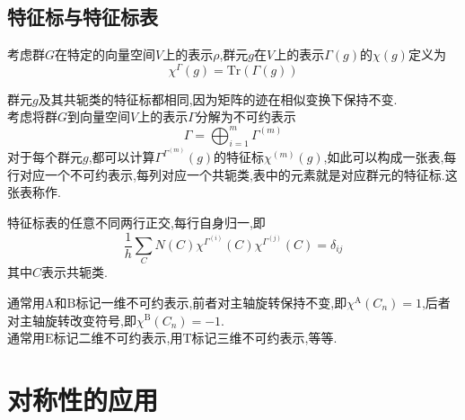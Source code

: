 \documentclass{ctexbook}
\begin{document}
\subsection{特征标与特征标表}
\begin{definition}[特征标]
    考虑群$G$在特定的向量空间$V$上的表示$\rho$,群元$g$在$V$上的表示$\Gamma(g)$的$\chi(g)$定义为
    \[\chi^{\Gamma}(g)=\text{Tr}(\Gamma(g))\]
\end{definition}
群元$g$及其共轭类的特征标都相同,因为矩阵的迹在相似变换下保持不变.\\
\indent 考虑将群$G$到向量空间$V$上的表示$\Gamma$分解为不可约表示
\[\Gamma=\bigoplus_{i=1}^{m}\Gamma^{(m)}\]
对于每个群元$g$,都可以计算$\Gamma^{\Gamma^{(m)}}(g)$的特征标$\chi^{(m)}(g)$,如此可以构成一张表,每行对应一个不可约表示,每列对应一个共轭类,表中的元素就是对应群元的特征标.这张表称作.
\begin{theorem}[正交归一定理]
    特征标表的任意不同两行正交,每行自身归一,即
    \[\dfrac{1}{h}\sum_{C}N(C)\chi^{\Gamma^{(i)}}(C)\chi^{\Gamma^{(j)}}(C)=\delta_{ij}\]
    其中$C$表示共轭类.
\end{theorem}
\begin{theorem}[不可约表示的标记]
    通常用$\text{A}$和$\text{B}$标记一维不可约表示,前者对主轴旋转保持不变,即$\chi^{\text{A}}(C_n)=1$,后者对主轴旋转改变符号,即$\chi^{\text{B}}(C_n)=-1$.\\
    通常用$\text{E}$标记二维不可约表示,用$\text{T}$标记三维不可约表示,等等.
\end{theorem}
\section{对称性的应用}
\end{document}
